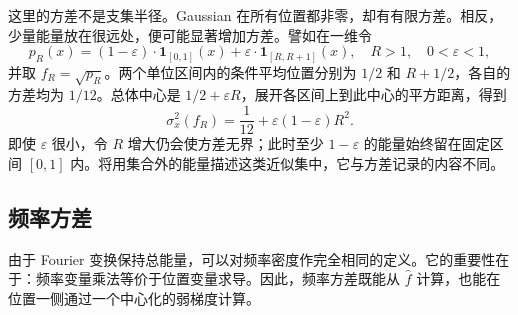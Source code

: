 这里的方差不是支集半径。Gaussian 在所有位置都非零，却有有限方差。相反，少量能量放在很远处，便可能显著增加方差。譬如在一维令
\[
 p_R(x)=(1-\varepsilon)\cdot\mathbf1_{[0,1]}(x)
        +\varepsilon\cdot\mathbf1_{[R,R+1]}(x),
 \quad R>1,\quad 0<\varepsilon<1,
\]
并取 \(f_R=\sqrt{p_R}\)。两个单位区间内的条件平均位置分别为 \(1/2\) 和 \(R+1/2\)，各自的方差均为 \(1/12\)。总体中心是 \(1/2+\varepsilon R\)，展开各区间上到此中心的平方距离，得到
\[
 \sigma_x^2(f_R)=\frac1{12}+\varepsilon(1-\varepsilon)R^2.
\]
即使 \(\varepsilon\) 很小，令 \(R\) 增大仍会使方差无界；此时至少 \(1-\varepsilon\) 的能量始终留在固定区间 \([0,1]\) 内。将用集合外的能量描述这类近似集中，它与方差记录的内容不同。

\subsection{频率方差}
\label{b2:subsec:200103}

由于 Fourier 变换保持总能量，可以对频率密度作完全相同的定义。它的重要性在于：频率变量乘法等价于位置变量求导。因此，频率方差既能从 \(\widehat f\) 计算，也能在位置一侧通过一个中心化的弱梯度计算。

